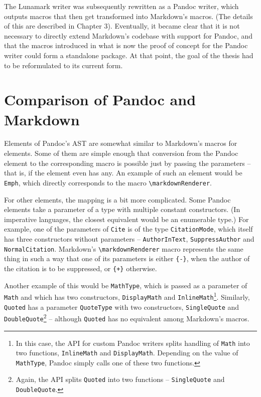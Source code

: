 \documentclass[
  digital,     %
  oneside,     %
  nosansbold,  %
  nocolorbold, %
  lof,         %
  nolot,       %
]{fithesis4}
\newcommand\macro[1]{\texttt{\textbackslash{}{#1}}}
\newcommand\renderer[1]{\macro{markdown\-Renderer\-{#1}}}
\begin{document}
The Lunamark writer was subsequently rewritten as a Pandoc writer, which outputs macros that then get transformed into Markdown's macros. (The details of this are described in Chapter 3). Eventually, it became clear that it is not necessary to directly extend Markdown's codebase with support for Pandoc, and that the macros introduced in what is now the proof of concept for the Pandoc writer could form a standalone package. At that point, the goal of the thesis had to be reformulated to its current form.

\section{Comparison of Pandoc and Markdown}

Elements of Pandoc's AST are somewhat similar to Markdown's macros for elements. Some of them are simple enough that conversion from the Pandoc element to the corresponding macro is possible just by passing the parameters -- that is, if the element even has any. An example of such an element would be \texttt{Emph}, which directly corresponds to the macro \renderer{Emphasis}.

For other elements, the mapping is a bit more complicated. Some Pandoc elements take a parameter of a type with multiple constant constructors. (In imperative languages, the closest equivalent would be an enumerable type.) For example, one of the parameters of \texttt{Cite} is of the type \texttt{CitationMode}, which itself has three constructors without parameters -- \texttt{AuthorInText}, \texttt{SuppressAuthor} and \texttt{NormalCitation}. Markdown's \renderer{Cite} macro represents the same thing in such a way that one of its parameters is either \texttt{\{-\}}, when the author of the citation is to be suppressed, or \texttt{\{+\}} otherwise.

Another example of this would be \texttt{MathType}, which is passed as a parameter of \texttt{Math} and which has two constructors, \texttt{DisplayMath} and \texttt{InlineMath}\footnote{In this case, the API for custom Pandoc writers splits handling of \texttt{Math} into two functions, \texttt{InlineMath} and \texttt{DisplayMath}. Depending on the value of \texttt{MathType}, Pandoc simply calls one of these two functions.}. Similarly, \texttt{Quoted} has a parameter \texttt{QuoteType} with two constructors, \texttt{SingleQuote} and \texttt{DoubleQuote}\footnote{Again, the API splits \texttt{Quoted} into two functions -- \texttt{SingleQuote} and \texttt{DoubleQuote}.} -- although \texttt{Quoted} has no equivalent among Markdown's macros.
\end{document}
